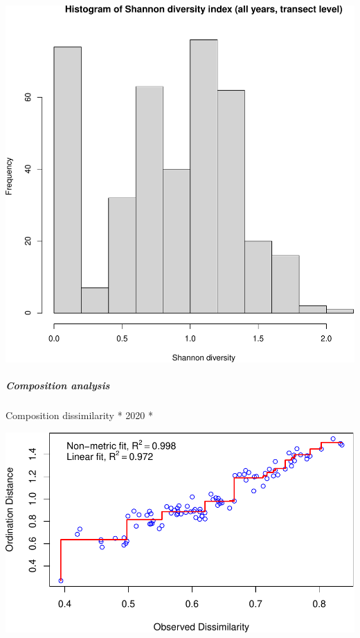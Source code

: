 \documentclass[
]{article}
\begin{document}
\includegraphics{log-project-aubrie-winnie_files/figure-latex/unnamed-chunk-2-1.pdf}

\hypertarget{composition-analysis}{%
\subparagraph{Composition analysis}\label{composition-analysis}}

Composition dissimilarity * 2020 *

\includegraphics{log-project-aubrie-winnie_files/figure-latex/unnamed-chunk-5-1.pdf}
\end{document}
